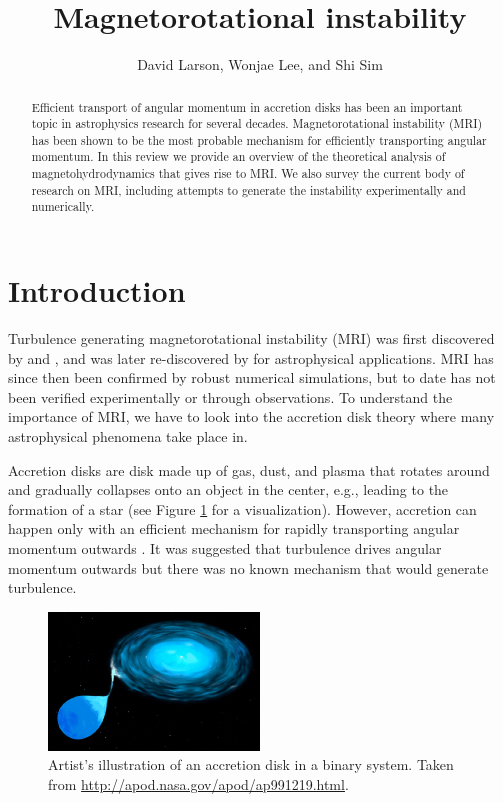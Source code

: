 \documentclass{jfm}
\title{Magnetorotational instability}
\author[Larson, Lee, and Sim]{David Larson, Wonjae Lee, and Shi Sim}
\affiliation{University of California, San Diego}
\begin{document}
\maketitle


\begin{abstract}
Efficient transport of angular momentum in accretion disks has been an
important topic in astrophysics research for several decades. Magnetorotational
instability (MRI) has been shown to be the most probable mechanism for
efficiently transporting angular momentum. In this review we provide an
overview of the theoretical analysis of magnetohydrodynamics that gives rise to
MRI. We also survey the current body of research on MRI, including attempts to
generate the instability experimentally and numerically.
\end{abstract}



\section{Introduction}
\label{sec:intro}

Turbulence generating magnetorotational instability (MRI) was first discovered
by \cite{Velikhov1959} and \cite{Chandrasekhar1960}, and was later
re-discovered by \cite{Balbus1998} for astrophysical applications. MRI has
since then been confirmed by robust numerical simulations, but to date has not
been verified experimentally or through observations. To understand the
importance of MRI, we have to look into the accretion disk theory where many
astrophysical phenomena take place in.

Accretion disks are disk made up of gas, dust, and plasma that rotates around
and gradually collapses onto an object in the center, e.g., leading to the
formation of a star (see Figure \ref{fig:accretion_disk} for a visualization).
However, accretion can happen only with an efficient mechanism for rapidly
transporting angular momentum outwards \citep{Julien2010}. It was suggested
that turbulence drives angular momentum outwards but there was no known
mechanism that would generate turbulence. 


\begin{figure}
    \centering
    \includegraphics[width=0.5\textwidth]{accretion_disk}
        \caption{Artist's illustration of an accretion disk in a binary system. Taken from \url{http://apod.nasa.gov/apod/ap991219.html}.}
        \label{fig:accretion_disk}
\end{figure}
\end{document}
